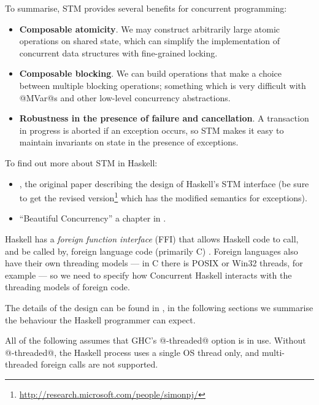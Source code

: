 
To summarise, STM provides several benefits for concurrent
programming:

\begin{itemize}
\item \textbf{Composable atomicity}.  We may construct arbitrarily large atomic
  operations on shared state, which can simplify the implementation of
  concurrent data structures with fine-grained locking.
\item \textbf{Composable blocking}.  We can build operations that make
  a choice between multiple blocking operations; something which is
  very difficult with @MVar@s and other low-level concurrency
  abstractions.
\item \textbf{Robustness in the presence of failure and cancellation}.
  A transaction in progress is aborted if an exception occurs, so STM
  makes it easy to maintain invariants on state in the presence of
  exceptions.
\end{itemize}


To find out more about STM in Haskell:

\begin{itemize}
\item \citet{stm}, the original paper describing the design of
  Haskell's STM interface (be sure to get the revised
  version\footnote{\url{http://research.microsoft.com/people/simonpj/}}
  which has the modified semantics for exceptions).
\item ``Beautiful Concurrency'' a chapter in \citet{beautiful-code}.
\end{itemize}


Haskell has a \emph{foreign function interface} (FFI) that allows
Haskell code to call, and be called by, foreign language code
(primarily C) \cite{haskell2010}.  Foreign languages also have their
own threading models --- in C there is POSIX or Win32 threads, for
example --- so we need to specify how Concurrent Haskell interacts
with the threading models of foreign code.

The details of the design can be found in \citet{conc-ffi}, in the
following sections we summarise the behaviour the Haskell programmer
can expect.

All of the following assumes that GHC's @-threaded@ option is in use.
Without @-threaded@, the Haskell process uses a single OS thread only,
and multi-threaded foreign calls are not supported.

